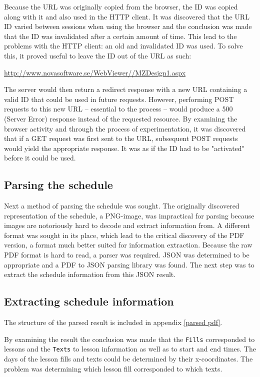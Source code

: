 \documentclass{article}
\begin{document}
	Because the URL was originally copied from the browser, the ID was copied along with it and also used in the HTTP client. It was discovered that the URL ID varied between sessions when using the browser and the conclusion was made that the ID was invalidated after a certain amount of time. This lead to the problems with the HTTP client: an old and invalidated ID was used. To solve this, it proved useful to leave the ID out of the URL as such:
	
	\url{http://www.novasoftware.se/WebViewer//MZDesign1.aspx}
	
	The server would then return a redirect response with a new URL containing a valid ID that could be used in future requests. However, performing POST requests to this new URL -- essential to the process -- would produce a 500 (Server Error) response instead of the requested resource. By examining the browser activity and through the process of experimentation, it was discovered that if a GET request was first sent to the URL, subsequent POST requests would yield the appropriate response. It was as if the ID had to be "activated" before it could be used.
	
	\subsection{Parsing the schedule}
	Next a method of parsing the schedule was sought. The originally discovered representation of the schedule, a PNG-image, was impractical for parsing because images are notoriously hard to decode and extract information from. A different format was sought in its place, which lead to the critical discovery of the PDF version, a format much better suited for information extraction. Because the raw PDF format is hard to read, a parser was required. JSON was determined to be appropriate and a PDF to JSON parsing library was found. The next step was to extract the schedule information from this JSON result.
	
	\subsection{Extracting schedule information}
	The structure of the parsed result is included in appendix \ref{parsed pdf}.
	
	By examining the result the conclusion was made that the \texttt{Fills} corresponded to lessons and the \texttt{Texts} to lesson information as well as to start and end times. The days of the lesson fills and texts could be determined by their x-coordinates. The problem was determining which lesson fill corresponded to which texts.
	\newpage
\end{document}
